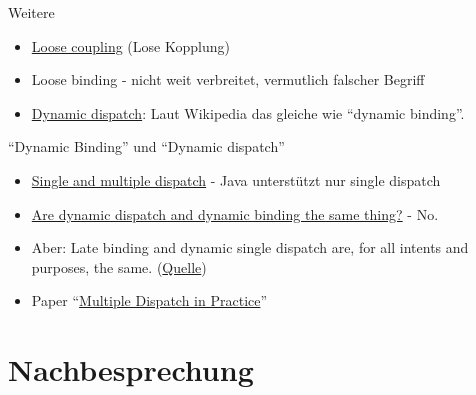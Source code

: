 \documentclass[usepdftitle=false,hyperref={pdfpagelabels=false}]{beamer}
\begin{document}
\begin{frame}{Weitere}
    \begin{itemize}
        \item \href{http://en.wikipedia.org/wiki/Loose_coupling}{Loose coupling} (Lose Kopplung)
        \item Loose binding - nicht weit verbreitet, vermutlich falscher Begriff
        \item \href{http://en.wikipedia.org/wiki/Dynamic_dispatch}{Dynamic dispatch}: 
              Laut Wikipedia das gleiche wie "`dynamic binding"'.
    \end{itemize}
\end{frame}

\begin{frame}{"`Dynamic Binding"' und "`Dynamic dispatch"'}
    \begin{itemize}
        \item \href{http://en.wikipedia.org/wiki/Dynamic_dispatch\#Single_and_multiple_dispatch}{Single and multiple dispatch} - Java unterstützt nur single dispatch
        \item \href{http://stackoverflow.com/questions/533330/dynamic-dispatch-and-binding}{Are dynamic dispatch and dynamic binding the same thing?} - No.
        \item Aber: Late binding and dynamic single dispatch are, for all intents and purposes, the same. (\href{http://stackoverflow.com/a/9470993/562769}{Quelle})
        \item Paper "`\href{http://homepages.mcs.vuw.ac.nz/~alex/files/MuscheviciPotaninTemperoNobleOOPSLA2008.pdf}{Multiple Dispatch in Practice}"'
    \end{itemize}
\end{frame}

\section{Nachbesprechung}
\end{document}
